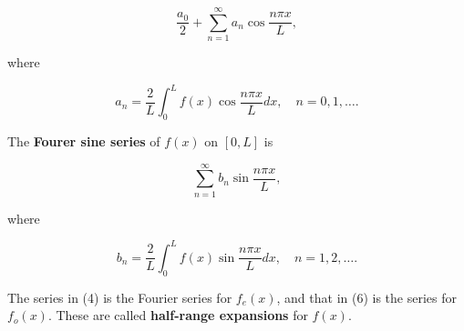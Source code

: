 \documentclass{article}
\begin{document}
\[ \frac{a_0}{2} + \sum_{n=1}^{\infty} a_n \cos{\frac{n \pi x}{L}}, \tag{4} \]

where

\[ a_n = \frac{2}{L} \int_0^{L} f(x) \cos{\frac{n \pi x}{L}} dx, \quad n = 0, 1, \dots . \]

The \textbf{Fourer sine series} of $f(x)$ on $[0, L]$ is

\[ \sum_{n=1}^{\infty} b_n \sin{\frac{n \pi x}{L}}, \tag{6} \]

where

\[ b_n = \frac{2}{L} \int_0^{L} f(x) \sin{\frac{n \pi x}{L}} dx, \quad n = 1,2, \dots . \]

The series in (4) is the Fourier series for $f_e(x)$, and that in (6) is the series for $f_o(x)$. These are called \textbf{half-range expansions} for $f(x)$.
\end{document}
